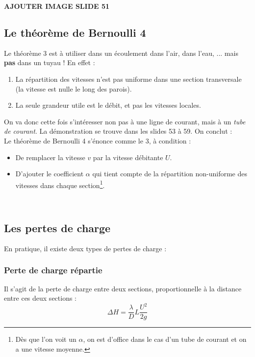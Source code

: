 	\textbf{AJOUTER IMAGE SLIDE 51}
	
	\subsection{Le théorème de Bernoulli 4}
	Le théorème 3 est à utiliser dans un écoulement dans l'air, dans l'eau, ... mais \textbf{pas} dans
	un tuyau ! En effet :
	\begin{enumerate}
	\item La répartition des vitesses n'est pas uniforme dans une section transversale (la vitesse 
	est nulle le long des parois).
	\item La seule grandeur utile est le débit, et pas les vitesses locales.
	\end{enumerate}
	On va donc cette fois s'intéresser non pas à une ligne de courant, mais à un \textit{tube de 
	courant}. La démonstration se trouve dans les slides 53 à 59. On conclut :\\
	Le théorème de Bernoulli 4 s'énonce comme le 3, à condition :
	\begin{itemize}
	\item De remplacer la vitesse $v$ par la vitesse débitante $U$.
	\item D'ajouter le coefficient $\alpha$ qui tient compte de la répartition non-uniforme des
	vitesses dans chaque section\footnote{Dès que l'on voit un $\alpha$, on est d'office dans le 
	cas d'un tube de courant et on a une vitesse moyenne.}.
	\end{itemize}\ 
	
	
	
	\subsection{Les pertes de charge}
	En pratique, il existe deux types de pertes de charge :

		\subsubsection{Perte de charge répartie}
		Il s'agit de la perte de charge entre deux sections, proportionnelle à la distance entre ces
		deux sections :
		\begin{equation}
		\Delta H = \frac{\lambda}{D}L\frac{U^2}{2g}
		\end{equation}

